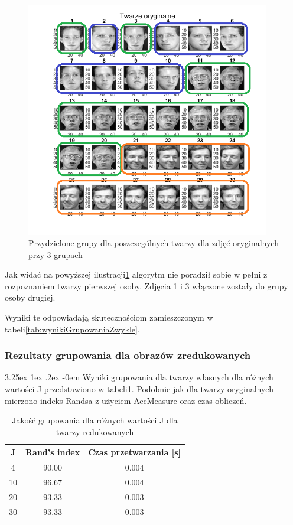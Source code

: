 \documentclass[11pt, a4paper]{article}
\makeatletter
\newcommand{\fbi}{\leavevmode{\parindent=1em\indent}}
\renewcommand\paragraph{\@startsection{paragraph}{5}{\z@}
  {3.25ex \@plus1ex \@minus.2ex}
  {-0em}
  {\normalfont\normalsize\bfseries}}
\makeatother
\begin{document}
\begin{figure}[H]
	\centering
	\includegraphics[width=0.95\textwidth]{./assets/ilustracja_zad2_dane_pogrupowane_3.png}
	\caption{Przydzielone grupy dla poszczególnych twarzy dla zdjęć oryginalnych przy 3 grupach}
	\label{fig:ilustracja_zad2_dane_pogrupowane_3}
\end{figure}

\fbi
Jak widać na powyższej ilustracji\ref{fig:ilustracja_zad2_dane_pogrupowane_3} algorytm nie poradził sobie w pełni z rozpoznaniem twarzy pierwszej osoby. Zdjęcia 1 i 3 włączone zostały do grupy osoby drugiej.

\fbi
Wyniki te odpowiadają skutecznościom zamieszczonym w tabeli\ref{tab:wynikiGrupowaniaZwykle}.


\subsubsection{Rezultaty grupowania dla obrazów zredukowanych}
\paragraph{}
Wyniki grupowania dla twarzy własnych dla różnych wartości J przedstawiono w tabeli\ref{tab:wynikiGrupowaniaWlasne}. Podobnie jak dla twarzy oryginalnych mierzono indeks Randsa z użyciem AccMeasure oraz czas obliczeń.

\begin{table}[H]
	\centering
	\caption{Jakość grupowania dla różnych wartości J dla twarzy redukowanych}
	\begin{tabular}{|c|c|c|}
		\hline 
		J & Rand's index & Czas przetwarzania [s] \\ 
		\hline
		4 & 90.00 & 0.004 \\
		\hline
		10 & 96.67 & 0.004 \\
		\hline
		20 & 93.33 & 0.003 \\
		\hline
		30 & 93.33 & 0.003 \\
		\hline
	\end{tabular}
	\label{tab:wynikiGrupowaniaWlasne}
\end{table}
\end{document}
